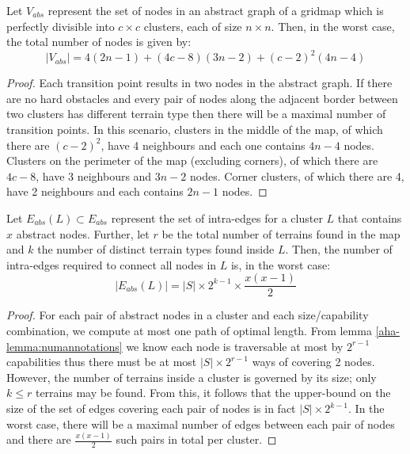 \begin{lemma}
\label{aha-lemma:maxnodes}
Let $V_{abs}$ represent the set of nodes in an abstract graph of a gridmap which is perfectly divisible into $c \times c$ clusters, each of size $n \times n$. Then, in the worst case, the total number of nodes is given by:
$$|V_{abs}| = 4(2n-1) + (4c - 8)(3n-2) + (c-2)^2(4n-4)$$
\end{lemma}

\begin{proof}
Each transition point results in two nodes in the abstract graph. 
If there are no hard obstacles and every pair of nodes along the adjacent border between two clusters has different terrain type then there will be a maximal number of transition points. 
In this scenario, clusters in the middle of the map, of which there are $(c-2)^2$, have 4 neighbours and each one contains $4n-4$ nodes. 
Clusters on the perimeter of the map (excluding corners), of which there are $4c-8$, have 3 neighbours and $3n-2$ nodes. 
Corner clusters, of which there are 4, have 2 neighbours and each contains $2n-1$ nodes.
\end{proof}

\begin{lemma}
\label{aha-lemma:maxedgesincluster}
Let $E_{abs}(L) \subset E_{abs}$ represent the set of intra-edges for a cluster $L$ that contains $x$ abstract nodes. Further, let $r$ be the total number of terrains found in the map and $k$ the number of distinct terrain types found inside $L$. Then, the number of intra-edges required to connect all nodes in $L$ is, in the worst case:
 $$|E_{abs}(L)| = |S|\times 2^{k-1} \times \frac{x(x-1)}{2}$$
 \end{lemma}

\begin{proof}
For each pair of abstract nodes in a cluster and each size/capability combination, we compute at most one path of optimal length. 
From lemma \ref{aha-lemma:numannotations} we know each node is traversable at most by $2^{r-1}$ capabilities thus there must be at most $|S|\times 2^{r-1}$ ways of covering 2 nodes. 
However, the number of terrains inside a cluster is governed by its size; only $k \leq r$ terrains may be found. 
From this, it follows that the upper-bound on the size of the set of edges covering each pair of nodes is in fact $|S| \times 2^{k-1}$. 
In the worst case, there will be a maximal number of edges between each pair of nodes and there are $\frac{x(x-1)}{2}$ such pairs in total per cluster. 
\end{proof}

